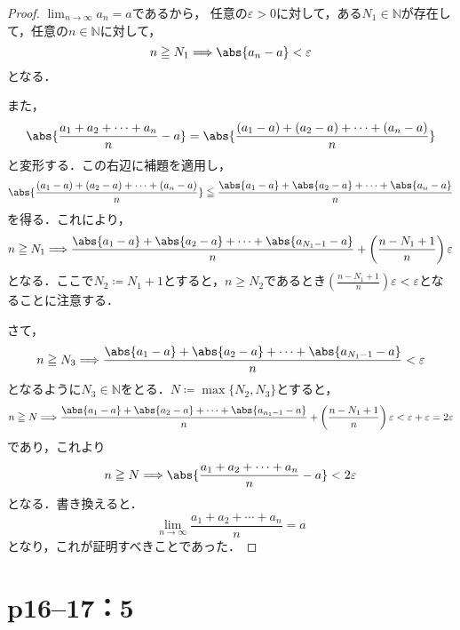 \documentclass[a4paper,10pt,fleqn]{ltjsarticle}
\begin{document}
\begin{tleftbar}
    \begin{proof}
        $\lim_{n \to \infty} a_n =a$であるから，
        任意の$\varepsilon >0$に対して，ある$N_1 \in \mathbb{N}$が存在して，任意の$n \in \mathbb{N}$に対して，
        \[
            n \ge N_1 \Longrightarrow \abs{a_n -a}<\varepsilon
        \]
        となる．

        また，
        \[
            \abs{\frac{a_1+a_2+\cdots+a_n}{n}-a}= \abs{\frac{(a_1-a)+(a_2-a)+\cdots+(a_n-a)}{n}}
        \]
        と変形する．この右辺に補題を適用し，
        \[
            \abs{\frac{(a_1-a)+(a_2-a)+\cdots+(a_n-a)}{n}} \leqq \frac{\abs{a_1-a}+\abs{a_2-a}+\cdots+\abs{a_n-a}}{n}
        \]
        を得る．これにより，
        \[
            n \ge N_1 \Longrightarrow \frac{\abs{a_1-a}+\abs{a_2-a}+\cdots+\abs{a_{N_1-1}-a}}{n} +\left( \frac{n-N_1+1}{n} \right ) \varepsilon
        \]
        となる．ここで$N_2 \coloneqq N_1 +1$とすると，$n \ge N_2$であるとき$\left( \frac{n-N_1+1}{n} \right ) \varepsilon < \varepsilon$となることに注意する．

        さて，
        \[
            n \ge N_3 \Longrightarrow \frac{\abs{a_1-a}+\abs{a_2-a}+\cdots+\abs{a_{N_1-1}-a}}{n}<\varepsilon
        \]
        となるように$N_3 \in \mathbb{N}$をとる．$N \coloneqq \max \{ N_2 , N_3 \}$とすると，
        \[
            n \ge N \Longrightarrow \frac{\abs{a_1-a}+\abs{a_2-a}+\cdots+\abs{a_{n_1-1}-a}}{n} +\left( \frac{n-N_1+1}{n} \right ) \varepsilon < \varepsilon + \varepsilon = 2 \varepsilon
        \]
        であり，これより
        \[
            n \ge N \Longrightarrow \abs{\frac{a_1+a_2+\cdots+a_n}{n}-a} < 2 \varepsilon
        \]
        となる．書き換えると．
        \[
            \lim_{n \to \infty} \frac{a_1+a_2+\cdots+a_n}{n}=a
        \]
        となり，これが証明すべきことであった．
    \end{proof}
\end{tleftbar}

\newpage

\section*{p16--17：5}
\end{document}
